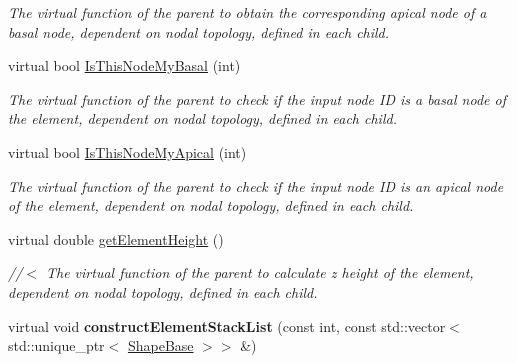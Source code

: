 \begin{DoxyCompactItemize}
\begin{DoxyCompactList}\small\item\em The virtual function of the parent to obtain the corresponding apical node of a basal node, dependent on nodal topology, defined in each child. \end{DoxyCompactList}\item 
\hypertarget{classShapeBase_aeeaf86469ce03277c978e0fd739e3751}{}virtual bool \hyperlink{classShapeBase_aeeaf86469ce03277c978e0fd739e3751}{Is\+This\+Node\+My\+Basal} (int)\label{classShapeBase_aeeaf86469ce03277c978e0fd739e3751}

\begin{DoxyCompactList}\small\item\em The virtual function of the parent to check if the input node I\+D is a basal node of the element, dependent on nodal topology, defined in each child. \end{DoxyCompactList}\item 
\hypertarget{classShapeBase_acede81712d5205c96fcd6acdaa574368}{}virtual bool \hyperlink{classShapeBase_acede81712d5205c96fcd6acdaa574368}{Is\+This\+Node\+My\+Apical} (int)\label{classShapeBase_acede81712d5205c96fcd6acdaa574368}

\begin{DoxyCompactList}\small\item\em The virtual function of the parent to check if the input node I\+D is an apical node of the element, dependent on nodal topology, defined in each child. \end{DoxyCompactList}\item 
\hypertarget{classShapeBase_a995a5e6a553ed0cdaadf74dab4f88822}{}virtual double \hyperlink{classShapeBase_a995a5e6a553ed0cdaadf74dab4f88822}{get\+Element\+Height} ()\label{classShapeBase_a995a5e6a553ed0cdaadf74dab4f88822}

\begin{DoxyCompactList}\small\item\em //$<$ The virtual function of the parent to calculate z height of the element, dependent on nodal topology, defined in each child. \end{DoxyCompactList}\item 
\hypertarget{classShapeBase_a5b73c76574b69c1d02ff75f76a8ccbb6}{}virtual void {\bfseries construct\+Element\+Stack\+List} (const int, const std\+::vector$<$ std\+::unique\+\_\+ptr$<$ \hyperlink{classShapeBase}{Shape\+Base} $>$$>$ \&)\label{classShapeBase_a5b73c76574b69c1d02ff75f76a8ccbb6}


\end{DoxyCompactItemize}
